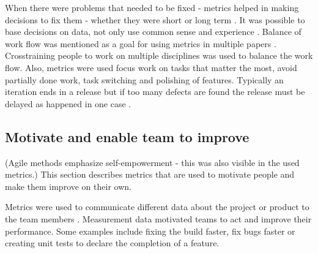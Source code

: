 \documentclass{sig-alternate}
\begin{document}
When there were problems that needed to be fixed - metrics helped in making
decisions to fix them - whether they were short or long term
\cite{Staron20101069}\cite{Dubinsky200512}\cite{Petersen2011975}\cite{LNBIP01490121}.
It was possible to base decisions on data, not only use common sense and
experience \cite{Talby200940}. Balance of work flow was mentioned as a goal
for using metrics in multiple papers
\cite{Polk2011263}\cite{Petersen2010654}\cite{Greening2010}\cite{Petersen2011975}\cite{Dubinsky200512}\cite{Jakobsen2011168}.
Crosstraining people to work on multiple disciplines was used to balance the
work flow\cite{Middleton2007387}\cite{Talby200940}. Also, metrics were used
focus work on tasks that matter the most, avoid partially done work, task
switching\cite{Seikola2011321} and polishing of features\cite{Talby200940}.
Typically an iteration ends in a release but if too many defects are found the
release must be delayed as happened in one case \cite{Hodgetts2004106}.



\subsection{Motivate and enable team to improve}
\label{Motivate}
(Agile methods emphasize self-empowerment - this was also
 visible in the used metrics.) This section describes metrics that are used to
 motivate people and make them improve on their own.

Metrics were used to communicate different data about the project or product
to the team members
\cite{Trapa2006243}\cite{Talby200940}\cite{Polk2011263}\cite{Staron20101069}\cite{Talby2006100}.
Measurement data motivated teams to act and improve their
performance\cite{Talby200940}\cite{Polk2011263}\cite{Cheng200929}\cite{LNBIP01490121}\cite{Jakobsen2011168}.
Some examples include fixing the build
faster\cite{Jakobsen2011168}\cite{LNBIP01490121}, fix bugs
faster\cite{Cheng200929} or creating unit tests to declare the completion of a
feature\cite{Talby200940}.
\end{document}

